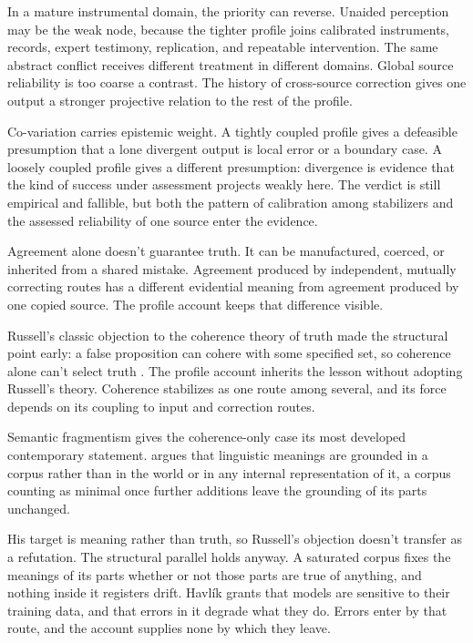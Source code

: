 \documentclass[12pt]{article}
\begin{document}
In a mature instrumental domain, the priority can reverse. Unaided perception may be the
weak node, because the tighter profile joins calibrated instruments, records, expert
testimony, replication, and repeatable intervention. The same abstract conflict
receives different treatment in different domains. Global source reliability is too
coarse a contrast. The history of cross-source correction gives one output a
stronger projective relation to the rest of the profile.

Co-variation carries epistemic weight. A tightly coupled profile gives a
defeasible presumption that a lone divergent output is local error or a boundary case. A
loosely coupled profile gives a different presumption: divergence is evidence that the
kind of success under assessment projects weakly here. The verdict is still empirical and
fallible, but both the pattern of calibration among stabilizers and the assessed
reliability of one source enter the evidence.

Agreement alone doesn't guarantee truth. It can be manufactured, coerced, or inherited
from a shared mistake. Agreement produced by independent, mutually correcting routes has a
different evidential meaning from agreement produced by one copied source. The profile
account keeps that difference visible.

Russell's classic objection to the coherence theory of truth made the structural point
early: a false proposition can cohere with some specified set, so coherence alone can't
select truth \citep{russell_1907_nature_truth}. The profile account inherits the lesson
without adopting Russell's theory. Coherence stabilizes as one route among several, and
its force depends on its coupling to input and correction routes.

Semantic fragmentism gives the coherence-only case its most developed contemporary
statement. \textcite{havlik_2024_meaning_understanding_llms_synthese} argues that
linguistic meanings are grounded in a corpus rather than in the world or in any internal
representation of it, a corpus counting as minimal once further additions leave the
grounding of its parts unchanged.

His target is meaning rather than truth, so Russell's objection doesn't transfer as a
refutation. The structural parallel holds anyway. A saturated corpus fixes the meanings
of its parts whether or not those parts are true of anything, and nothing inside it
registers drift. Havlík grants that models
are sensitive to their training data, and that errors in it degrade what they do. Errors
enter by that route, and the account supplies none by which they leave.
\end{document}
